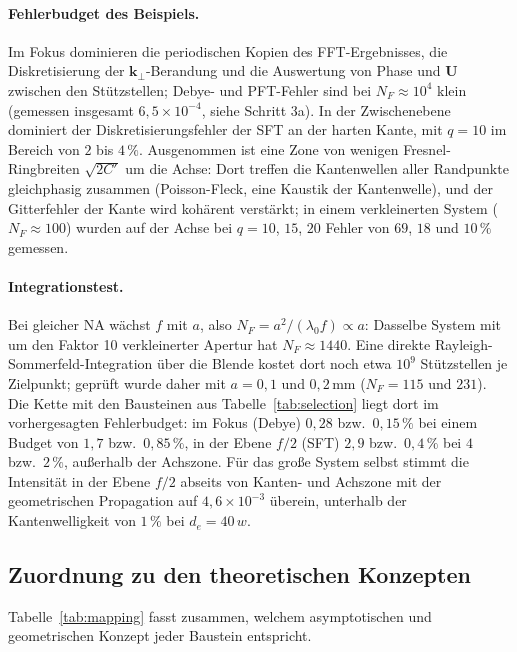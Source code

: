 \documentclass[11pt,a4paper]{scrartcl}
\theoremstyle{insightstyle}
\newcommand{\kp}{\bm{k}_\perp}
\begin{document}
\paragraph{Fehlerbudget des Beispiels.} Im Fokus dominieren die periodischen Kopien des FFT-Ergebnisses, die Diskretisierung der $\kp$-Berandung und die Auswertung von Phase und $\bm U$ zwischen den Stützstellen; Debye- und PFT-Fehler sind bei $N_F\approx10^4$ klein (gemessen insgesamt $6{,}5\times10^{-4}$, siehe Schritt 3a). In der Zwischenebene dominiert der Diskretisierungsfehler der SFT an der harten Kante, mit $q=10$ im Bereich von $2$ bis $4\,\%$. Ausgenommen ist eine Zone von wenigen Fresnel-Ringbreiten $\sqrt{2C'}$ um die Achse: Dort treffen die Kantenwellen aller Randpunkte gleichphasig zusammen (Poisson-Fleck, eine Kaustik der Kantenwelle), und der Gitterfehler der Kante wird kohärent verstärkt; in einem verkleinerten System ($N_F\approx100$) wurden auf der Achse bei $q=10$, $15$, $20$ Fehler von $69$, $18$ und $10\,\%$ gemessen.

\paragraph{Integrationstest.} Bei gleicher NA wächst $f$ mit $a$, also $N_F=a^2/(\lambda_0f)\propto a$: Dasselbe System mit um den Faktor 10 verkleinerter Apertur hat $N_F\approx1440$. Eine direkte Rayleigh-Sommerfeld-Integration über die Blende kostet dort noch etwa $10^9$ Stützstellen je Zielpunkt; geprüft wurde daher mit $a=0{,}1$ und $0{,}2\,$mm ($N_F=115$ und $231$). Die Kette mit den Bausteinen aus Tabelle~\ref{tab:selection} liegt dort im vorhergesagten Fehlerbudget: im Fokus (Debye) $0{,}28$ bzw.\ $0{,}15\,\%$ bei einem Budget von $1{,}7$ bzw.\ $0{,}85\,\%$, in der Ebene $f/2$ (SFT) $2{,}9$ bzw.\ $0{,}4\,\%$ bei $4$ bzw.\ $2\,\%$, außerhalb der Achszone. Für das große System selbst stimmt die Intensität in der Ebene $f/2$ abseits von Kanten- und Achszone mit der geometrischen Propagation auf $4{,}6\times10^{-3}$ überein, unterhalb der Kantenwelligkeit von $1\,\%$ bei $d_e=40\,w$.

\subsection{Zuordnung zu den theoretischen Konzepten}\label{sec:mapping}
Tabelle~\ref{tab:mapping} fasst zusammen, welchem asymptotischen und geometrischen Konzept jeder Baustein entspricht.
\end{document}
